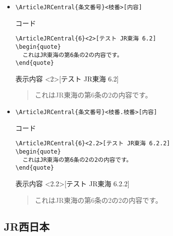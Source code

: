 \documentclass[oneside,10pt,a4paper]{jsarticle}
\begin{document}
\begin{itemize}
    \item \verb|\ArticleJRCentral{条文番号}<枝番>[内容]|
      \begin{itembox}[l]{コード}
        {\footnotesize\begin{verbatim}
\ArticleJRCentral{6}<2>[テスト JR東海 6.2]
\begin{quote}
  これはJR東海の第6条の2の内容です。
\end{quote}\end{verbatim}}
      \end{itembox}
      \begin{itembox}[l]{表示内容}
        <2>[テスト JR東海 6.2]
        \begin{quote}
          これはJR東海の第6条の2の内容です。
        \end{quote}
      \end{itembox}
    \item \verb|\ArticleJRCentral{条文番号}<枝番.枝番>[内容]|
      \begin{itembox}[l]{コード}
        {\footnotesize\begin{verbatim}
\ArticleJRCentral{6}<2.2>[テスト JR東海 6.2.2]
\begin{quote}
  これはJR東海の第6条の2の2の内容です。
\end{quote}\end{verbatim}}
      \end{itembox}
      \begin{itembox}[l]{表示内容}
        <2.2>[テスト JR東海 6.2.2]
        \begin{quote}
          これはJR東海の第6条の2の2の内容です。
        \end{quote}
      \end{itembox}
  \end{itemize}

  \newpage

  \subsection{JR西日本}
\end{document}
